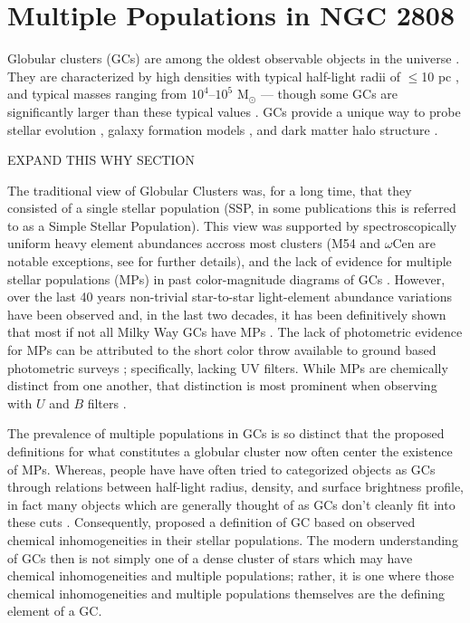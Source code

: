 \chapter{Multiple Populations in NGC 2808}
Globular clusters (GCs) are among the oldest observable objects in the universe
\citep{Pen11}. They are characterized by high densities with typical half-light
radii of $\le$10 pc \citep{Vanderburg2010}, and typical masses ranging from
$10^{4}$--$10^{5}$ M$_{\odot}$ \citep{Bro06} --- though some GCs are
significantly larger than these typical values \citep[e.g. $\omega$Cen,
][]{Richer1991}. GCs provide a unique way to probe stellar evolution
\citep{Bau03}, galaxy formation models \citep{Boy18,Kra05}, and dark matter
halo structure \citep{Hud18}.

{\color{red}EXPAND THIS WHY SECTION}

The traditional view of Globular Clusters was, for a long time, that they
consisted of a single stellar population (SSP, in some publications this is
referred to as a Simple Stellar Population). This view was supported by
spectroscopically uniform heavy element abundances \citep{Carretta2010,
Bastian2018} accross most clusters (M54 and $\omega$Cen are notable exceptions,
see \citet{Marino2015} for further details), and the lack of evidence for
multiple stellar populations (MPs) in past color-magnitude diagrams of GCs
\citep[i.e.][]{Sandage1953, Alcaino1975}. However, over the last 40 years
non-trivial star-to-star light-element abundance variations have been observed
\citep[i.e.][]{Smith1987} and, in the last two decades, it has been
definitively shown that most if not all Milky Way GCs have MPs
\citep{Gratton2004, Gratton2012, Piotto2015}. The lack of photometric evidence
for MPs can be attributed to the short color throw available to ground based
photometric surveys \citep{Milone2017}; specifically, lacking UV filters. While
MPs are chemically distinct from one another, that distinction is most
prominent when observing with $U$ and $B$ filters \citep{Sbordone2011}.

The prevalence of multiple populations in GCs is so distinct that the proposed
definitions for what constitutes a globular cluster now often center the
existence of MPs. Whereas, people have have often tried to categorized objects
as GCs through relations between half-light radius, density, and surface
brightness profile, in fact many objects which are generally thought of as GCs
don't cleanly fit into these cuts \citep{Peebles1968, Brown1991, Brown1995, Bekki2002}.
Consequently, \citet{Carretta2010} proposed a definition of GC based on
observed chemical inhomogeneities in their stellar populations. The modern
understanding of GCs then is not simply one of a dense cluster of stars which
may have chemical inhomogeneities and multiple populations; rather, it is one
where those chemical inhomogeneities and multiple populations themselves are
the defining element of a GC.

